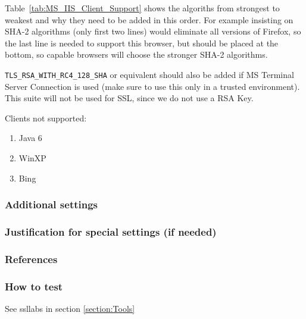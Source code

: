 Table~\ref{tab:MS_IIS_Client_Support} shows the algoriths from
strongest to weakest and why they need to be added in this order. For
example insisting on SHA-2 algorithms (only first two lines) would
eliminate all versions of Firefox, so the last line is needed to
support this browser, but should be placed at the bottom, so capable
browsers will choose the stronger SHA-2 algorithms.

\verb|TLS_RSA_WITH_RC4_128_SHA| or equivalent should also be added if
MS Terminal Server Connection is used (make sure to use this only in a
trusted environment). This suite will not be used for SSL, since we do
not use a RSA Key.




Clients not supported:
\begin{enumerate}
\item Java 6
\item WinXP
\item Bing
\end{enumerate}

\subsubsection{Additional settings}


\subsubsection{Justification for special settings (if needed)}


\subsubsection{References}



\subsubsection{How to test}
See ssllabs in section \ref{section:Tools}


